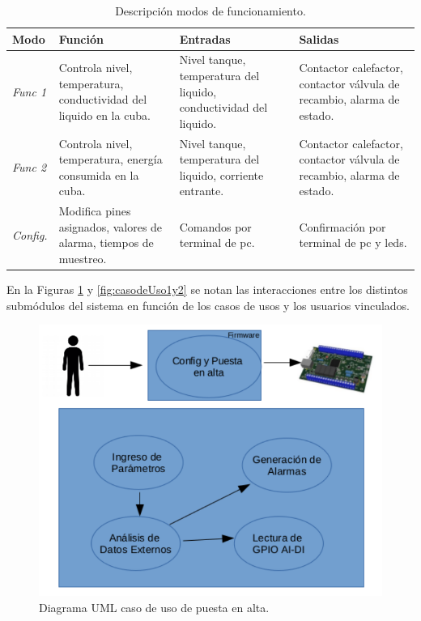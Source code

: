 \begin{table}[h!]
\hspace{-0.5cm}
\begin{flushleft}
\begin{tabular}{|m{}|m{4cm}|m{4cm}|m{4cm}|} \hline
{\textbf{Modo}} & {\textbf{Función}} & {\textbf{Entradas}} & {\textbf{Salidas}}\\ \hline
{\textit{Func 1}} & {Controla nivel, temperatura, conductividad del liquido en la cuba.} & { Nivel tanque, temperatura del liquido, conductividad del liquido.} & {Contactor calefactor, contactor válvula de recambio, alarma de estado.} \\ \hline
{\textit{Func 2}} & {Controla nivel, temperatura, energía consumida en la cuba.} & {Nivel tanque, temperatura del liquido, corriente entrante.} & {Contactor calefactor, contactor válvula de recambio, alarma de estado.} \\ \hline
{\textit{Config.}} & {Modifica pines asignados, valores de alarma, tiempos de muestreo.} & {Comandos por terminal de pc.} & {Confirmación por terminal de pc y leds.} \\ \hline
\end{tabular}
\end{flushleft}

\caption{Descripción modos de funcionamiento.}
\label{modos_funcionamiento}
\end{table}

En la Figuras \ref{fig:casoUsoAlta} y \ref{fig:casodeUso1y2} se notan las interacciones entre los distintos submódulos del sistema en función de los casos de usos y los usuarios vinculados.

\begin{figure}[h!]
	\centering
	\includegraphics[width=.9\textwidth]{Figures/Cap_2/caso_uso_Alta_UML}
	\caption{Diagrama UML caso de uso de puesta en alta.}
	\label{fig:casoUsoAlta}
\end{figure}

